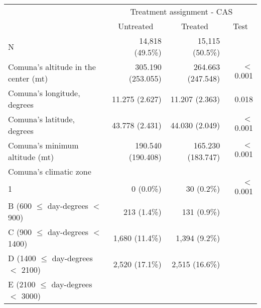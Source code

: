 \documentclass{article}
\begin{document}
\begin{table}[!h]
\centering
\begin{tabular}{llll}
\cline{1-4}
\multicolumn{1}{r}{} &
  \multicolumn{3}{c}{Treatment assignment - CAS} \\
\multicolumn{1}{r}{} &
  \multicolumn{1}{c}{Untreated} &
  \multicolumn{1}{c}{Treated} &
  \multicolumn{1}{c}{Test} \\
\cline{1-4}
\multicolumn{1}{l}{N} &
  \multicolumn{1}{r}{14,818 (49.5\%)} &
  \multicolumn{1}{r}{15,115 (50.5\%)} &
  \multicolumn{1}{r}{} \\
\multicolumn{1}{l}{Comuna's altitude in the center (mt)} &
  \multicolumn{1}{r}{305.190 (253.055)} &
  \multicolumn{1}{r}{264.663 (247.548)} &
  \multicolumn{1}{r}{$<$0.001} \\
\multicolumn{1}{l}{Comuna's longitude, degrees} &
  \multicolumn{1}{r}{11.275 (2.627)} &
  \multicolumn{1}{r}{11.207 (2.363)} &
  \multicolumn{1}{r}{0.018} \\
\multicolumn{1}{l}{Comuna's latitude, degrees} &
  \multicolumn{1}{r}{43.778 (2.431)} &
  \multicolumn{1}{r}{44.030 (2.049)} &
  \multicolumn{1}{r}{$<$0.001} \\
\multicolumn{1}{l}{Comuna's minimum altitude (mt)} &
  \multicolumn{1}{r}{190.540 (190.408)} &
  \multicolumn{1}{r}{165.230 (183.747)} &
  \multicolumn{1}{r}{$<$0.001} \\
\multicolumn{1}{l}{Comuna's climatic zone} &
  \multicolumn{1}{r}{} &
  \multicolumn{1}{r}{} &
  \multicolumn{1}{r}{} \\
\multicolumn{1}{l}{\hspace{1em}1} &
  \multicolumn{1}{r}{0 (0.0\%)} &
  \multicolumn{1}{r}{30 (0.2\%)} &
  \multicolumn{1}{r}{$<$0.001} \\
\multicolumn{1}{l}{\hspace{1em}B (600 $\le$ day-degrees $<$ 900)} &
  \multicolumn{1}{r}{213 (1.4\%)} &
  \multicolumn{1}{r}{131 (0.9\%)} &
  \multicolumn{1}{r}{} \\
\multicolumn{1}{l}{\hspace{1em}C (900 $\le$ day-degrees $<$ 1400)} &
  \multicolumn{1}{r}{1,680 (11.4\%)} &
  \multicolumn{1}{r}{1,394 (9.2\%)} &
  \multicolumn{1}{r}{} \\
\multicolumn{1}{l}{\hspace{1em}D (1400 $\le$ day-degrees $<$ 2100)} &
  \multicolumn{1}{r}{2,520 (17.1\%)} &
  \multicolumn{1}{r}{2,515 (16.6\%)} &
  \multicolumn{1}{r}{} \\
\multicolumn{1}{l}{\hspace{1em}E (2100 $\le$ day-degrees $<$ 3000)} &

\end{tabular}
\end{table}
\end{document}
